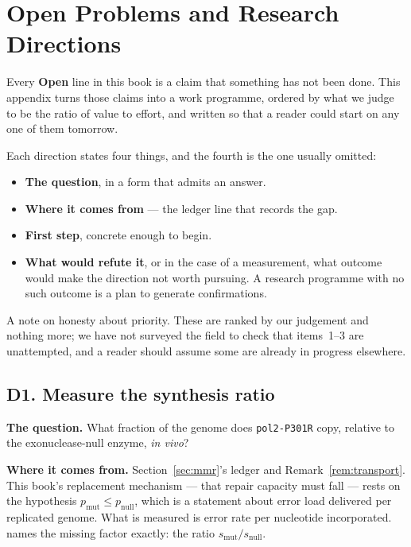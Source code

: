 \section{Open Problems and Research Directions}\label{app:directions}

Every \textbf{Open} line in this book is a claim that something has not been
done. This appendix turns those claims into a work programme, ordered by what we
judge to be the ratio of value to effort, and written so that a reader could
start on any one of them tomorrow.

Each direction states four things, and the fourth is the one usually omitted:

\begin{itemize}[leftmargin=*,itemsep=1pt,topsep=2pt]
  \item \textbf{The question}, in a form that admits an answer.
  \item \textbf{Where it comes from} --- the ledger line that records the gap.
  \item \textbf{First step}, concrete enough to begin.
  \item \textbf{What would refute it}, or in the case of a measurement, what
        outcome would make the direction not worth pursuing. A research
        programme with no such outcome is a plan to generate confirmations.
\end{itemize}

A note on honesty about priority. These are ranked by our judgement and nothing
more; we have not surveyed the field to check that items~1--3 are unattempted,
and a reader should assume some are already in progress elsewhere.

\subsection*{D1. Measure the synthesis ratio}

\textbf{The question.} What fraction of the genome does \texttt{pol2-P301R}
copy, relative to the exonuclease-null enzyme, \emph{in vivo}?

\textbf{Where it comes from.} Section~\ref{sec:mmr}'s ledger and
Remark~\ref{rem:transport}. This book's replacement mechanism --- that repair
capacity must fall --- rests on the hypothesis
$p_{\mathrm{mut}} \le p_{\mathrm{null}}$, which is a statement about error load
delivered per replicated genome. What is measured is error rate per nucleotide
incorporated.  names the missing factor
exactly: the ratio $s_{\mathrm{mut}}/s_{\mathrm{null}}$.

